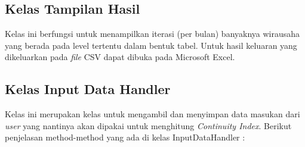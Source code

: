 \subsection{Kelas Tampilan Hasil}
Kelas ini berfungsi untuk menampilkan iterasi (per bulan) banyaknya wirausaha yang berada pada level tertentu dalam bentuk tabel. Untuk hasil keluaran yang dikeluarkan pada \textit{file} CSV dapat dibuka pada Microsoft Excel.

\subsection{Kelas Input Data Handler}
Kelas ini merupakan kelas untuk mengambil dan menyimpan data masukan dari \textit{user} yang nantinya akan dipakai untuk menghitung \textit{Continuity Index}.
Berikut penjelasan method-method yang ada di kelas InputDataHandler :

